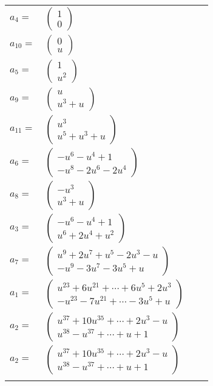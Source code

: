\documentclass[1p]{elsarticle_modified}
\theoremstyle{definition}
\begin{document}
\begin{tabular}{m{7pt} m{180pt} m{7pt} m{180pt} }
\flushright $a_{4}=$&$\begin{pmatrix}1\\0\end{pmatrix}$ \\
\flushright $a_{10}=$&$\begin{pmatrix}0\\u\end{pmatrix}$ \\
\flushright $a_{5}=$&$\begin{pmatrix}1\\u^2\end{pmatrix}$ \\
\flushright $a_{9}=$&$\begin{pmatrix}u\\u^3+u\end{pmatrix}$ \\
\flushright $a_{11}=$&$\begin{pmatrix}u^3\\u^5+u^3+u\end{pmatrix}$ \\
\flushright $a_{6}=$&$\begin{pmatrix}- u^6- u^4+1\\- u^8-2 u^6-2 u^4\end{pmatrix}$ \\
\flushright $a_{8}=$&$\begin{pmatrix}- u^3\\u^3+u\end{pmatrix}$ \\
\flushright $a_{3}=$&$\begin{pmatrix}- u^6- u^4+1\\u^6+2 u^4+u^2\end{pmatrix}$ \\
\flushright $a_{7}=$&$\begin{pmatrix}u^9+2 u^7+u^5-2 u^3- u\\- u^9-3 u^7-3 u^5+u\end{pmatrix}$ \\
\flushright $a_{1}=$&$\begin{pmatrix}u^{23}+6 u^{21}+\cdots+6 u^5+2 u^3\\- u^{23}-7 u^{21}+\cdots-3 u^5+u\end{pmatrix}$ \\
\flushright $a_{2}=$&$\begin{pmatrix}u^{37}+10 u^{35}+\cdots+2 u^3- u\\u^{38}- u^{37}+\cdots+u+1\end{pmatrix}$\\ \flushright $a_{2}=$&$\begin{pmatrix}u^{37}+10 u^{35}+\cdots+2 u^3- u\\u^{38}- u^{37}+\cdots+u+1\end{pmatrix}$\\&\end{tabular}
\end{document}
